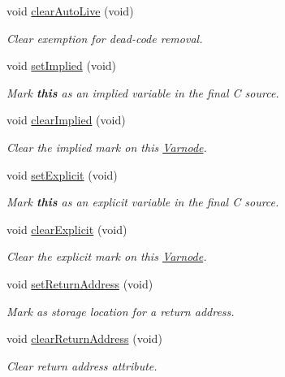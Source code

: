 \begin{DoxyCompactItemize}
void \mbox{\hyperlink{class_varnode_a39d6bd8e32a09ade4ce560a4356c379b}{clear\+Auto\+Live}} (void)
\begin{DoxyCompactList}\small\item\em Clear exemption for dead-\/code removal. \end{DoxyCompactList}\item 
void \mbox{\hyperlink{class_varnode_a9a59015e5303190f843f3f30bc63984c}{set\+Implied}} (void)
\begin{DoxyCompactList}\small\item\em Mark {\bfseries{this}} as an {\itshape implied} variable in the final C source. \end{DoxyCompactList}\item 
void \mbox{\hyperlink{class_varnode_a96b03abe7bd0167af9e1f3973da7fafd}{clear\+Implied}} (void)
\begin{DoxyCompactList}\small\item\em Clear the {\itshape implied} mark on this \mbox{\hyperlink{class_varnode}{Varnode}}. \end{DoxyCompactList}\item 
void \mbox{\hyperlink{class_varnode_a5eb9800b2395d8d920d576bfa2757eee}{set\+Explicit}} (void)
\begin{DoxyCompactList}\small\item\em Mark {\bfseries{this}} as an {\itshape explicit} variable in the final C source. \end{DoxyCompactList}\item 
void \mbox{\hyperlink{class_varnode_a6888c038caae03864e546019018af619}{clear\+Explicit}} (void)
\begin{DoxyCompactList}\small\item\em Clear the {\itshape explicit} mark on this \mbox{\hyperlink{class_varnode}{Varnode}}. \end{DoxyCompactList}\item 
void \mbox{\hyperlink{class_varnode_a5f5028eda92941ae7f12728c16e28243}{set\+Return\+Address}} (void)
\begin{DoxyCompactList}\small\item\em Mark as storage location for a return address. \end{DoxyCompactList}\item 
void \mbox{\hyperlink{class_varnode_ad4d387ef43c2d52914b52bc428ba436b}{clear\+Return\+Address}} (void)
\begin{DoxyCompactList}\small\item\em Clear return address attribute. \end{DoxyCompactList}\item 

\end{DoxyCompactItemize}
